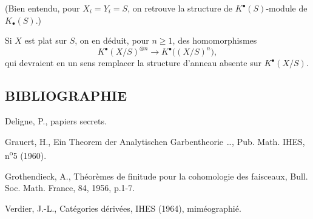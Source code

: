(Bien entendu, pour \(X_i=Y_i=S\), on retrouve la structure de \(K^{\bullet}(S)\)-module de \(K_{\bullet}(S)\).)

Si \(X\) est plat sur \(S\), on en déduit, pour \(n\geq1\), des homomorphismes
\[
 K^{\bullet}(X/S)^{\otimes n}\longrightarrow K^{\bullet}\bigl((X/S)^n\bigr),
\]
qui devraient en un sens remplacer la structure d'anneau absente sur \(K^{\bullet}(X/S)\).

\subsection*{BIBLIOGRAPHIE}
\begin{enumerate}[label={[\arabic*]}]
\item Deligne, P., papiers secrets.
\item Grauert, H., Ein Theorem der Analytischen Garbentheorie \dots, Pub. Math. IHES, n\textsuperscript{o}5 (1960).
\item Grothendieck, A., Théorèmes de finitude pour la cohomologie des faisceaux, Bull. Soc. Math. France, 84, 1956, p.1-7.
\item[{[V]}] Verdier, J.-L., Catégories dérivées, IHES (1964), miméographié.
\end{enumerate}



\providecommand{\Chat}{\widehat C}
\providecommand{\Ghat}{\widehat G}
\providecommand{\Gg}{\widehat G_g}
\providecommand{\Ga}{\widehat G_a}
\providecommand{\Grhat}{\widehat{\operatorname{Gr}}}
\providecommand{\Abfil}{\underline{\mathrm{Ab}}\,\underline{\mathrm{fil}}}
\providecommand{\Kalgfil}{K\text{-}\mathrm{Alg.fil.}}
\providecommand{\Hom}{\operatorname{Hom}}
\providecommand{\Sym}{\mathfrak S}
\renewcommand{\id}{\operatorname{Id}}
\providecommand{\Log}{\operatorname{Log}}
\providecommand{\Toddc}{\operatorname{Todd}}
\renewcommand{\Ob}{\operatorname{Ob}}
\providecommand{\cG}{\mathcal G}
\providecommand{\cCzero}{\mathcal C_0}
\providecommand{\Fil}{\operatorname{Fil}}


